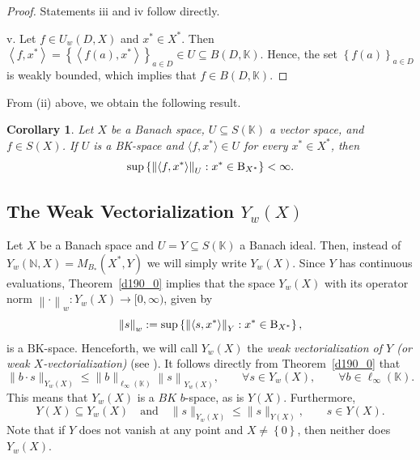 \documentclass[14pt, a4paper]{article}  %
\providecommand{\llave}[1]{\left\lbrace #1\right\rbrace }
\providecommand{\pare}[1]{\left( #1\right) }
\providecommand{\norm}[1]{\left\lVert#1\right\rVert}
\newcommand{\K}{\mathbb{K}}
\newcommand{\N}{\mathbb{N}}
\newcommand{\BK}{\text{BK}}
\newcommand{\B}{\textup{B}}
\newcommand{\la}{\left\langle}
\newcommand{\ra}{\right\rangle}
\newtheorem{corollary}{Corollary}[section]
\begin{document}
\begin{proof}
			Statements iii and iv follow directly.
			
			v.  Let $f\in U_{w}\pare{D,X}$ and $x^{*}\in X^{*}$. Then $\la f, x^{*}\ra=\llave{\la f\pare{a},x^{*}\ra}_{a\in D}\in U\subseteq B\pare{D,\K}$. Hence, the set $\llave{f\pare{a}}_{a\in D}$ is weakly bounded, which implies that $f\in B\pare{D,\K}$.
		\end{proof}
		
		
	
		
 
		
		From (ii) above, we obtain the following result.
		
	\begin{corollary}
		Let $X$ be a Banach space, $U \subseteq S(\K)$ a vector space, and $f \in S\pare{X}$. If $U$ is a BK-space and $\langle f, x^{*} \rangle \in U$ for every $x^{*} \in X^{*}$, then
		\begin{equation}
			\sup \llave{\norm{\langle f, x^{*} \rangle}_{U} : x^{*} \in \B_{X^{*}}}<\infty.
		\end{equation}
	\end{corollary}
	
	
	 
		 
		
		\subsection{The Weak Vectorialization  $Y_{w}\pare{X}$}
		
		
		
		Let $X$ be a Banach space and $U=Y\subseteq S\pare{\K}$  a Banach ideal. Then, instead of $Y_{w}\pare{\N,X}=M_{B_{*}}\pare{X^{*},Y}$ we will simply write $Y_{w}\pare{X}$. Since $Y$ has continuous evaluations, Theorem~\ref{d190_0} implies that the space $Y_{w}\pare{X}$ with its operator norm $\norm{\cdot}_{w}:Y_{w}\pare{X}\to [0,\infty)$, given by
		\begin{equation}
			\norm{s}_{w} := \sup\left\{\norm{\la s,x^{*}\ra}_{Y} : x^{*} \in \B_{X^{*}}\right\},
		\end{equation}
		is a $\BK$-space. Henceforth, we will call $Y_{w}\pare{X}$ the \emph{weak vectorialization of $Y$ (or weak $X$-vectorialization)} (see \cite[p. 32]{DJT}).  It follows directly from Theorem~\ref{d190_0} that
			\begin{equation}
				\|b \cdot s\|_{Y_{w}(X)} \leq \|b\|_{\ell_{\infty}\pare{\K}} \norm{s}_{Y_{w}(X)}, \qquad \forall s\in Y_{w}(X),\qquad \forall b\in \ell_{\infty}\pare{\K}.
			\end{equation} 
			This means that $Y_{w}(X)$ is a   $BK$ $b$-space, as is $Y(X)$.  Furthermore,
			\begin{equation}
				Y(X) \subseteq Y_w(X) \quad \text{and}\quad 	\|s\|_{Y_w(X)} \leq \|s\|_{Y(X)}, \qquad s\in Y(X). 
			\end{equation} 
		Note that if $Y$ does not vanish at any point and $X\neq \llave{0}$, then neither does $Y_{w}\pare{X}$.
		
\end{document}
